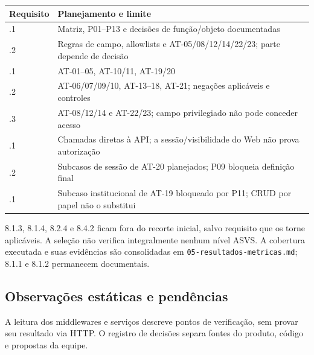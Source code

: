 {\def\LTcaptype{none} %
\begin{longtable}[]{@{}
  >{\raggedright\arraybackslash}p{}
  >{\raggedright\arraybackslash}p{}@{}}
\toprule\noalign{}
\begin{minipage}[b]{\linewidth}\raggedright
Requisito
\end{minipage} & \begin{minipage}[b]{\linewidth}\raggedright
Planejamento e limite
\end{minipage} \\
\midrule\noalign{}
\endhead
\bottomrule\noalign{}
\endlastfoot
8.1.1 & Matriz, P01--P13 e decisões de função/\allowbreak{}objeto documentadas \\
8.1.2 & Regras de campo, allowlists e AT-05/08/12/14/22/23; parte
depende de decisão \\
8.2.1 & AT-01--05, AT-10/11, AT-19/20 \\
8.2.2 & AT-06/07/09/10, AT-13--18, AT-21; negações aplicáveis e
controles \\
8.2.3 & AT-08/12/14 e AT-22/23; campo privilegiado não pode conceder
acesso \\
8.3.1 & Chamadas diretas à API; a sessão/\allowbreak{}visibilidade do Web não prova
autorização \\
8.3.2 & Subcasos de sessão de AT-20 planejados; P09 bloqueia definição
final \\
8.4.1 & Subcaso institucional de AT-19 bloqueado por P11; CRUD por papel
não o substitui \\
\end{longtable}
}

8.1.3, 8.1.4, 8.2.4 e 8.4.2 ficam fora do recorte inicial, salvo
requisito que os torne aplicáveis. A seleção não verifica integralmente
nenhum nível ASVS. A cobertura executada e suas evidências são
consolidadas em \texttt{05-resultados-metricas.md}; 8.1.1 e 8.1.2
permanecem documentais.

\subsection{Observações estáticas e
pendências}\label{observauxe7uxf5es-estuxe1ticas-e-penduxeancias}

A leitura dos middlewares e serviços descreve pontos de verificação, sem
provar seu resultado via HTTP. O registro de decisões separa fontes do
produto, código e propostas da equipe.

